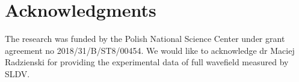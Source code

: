 \documentclass[preprint,9pt]{elsarticle}
\begin{document}
\clearpage	
\section*{Acknowledgments}
The research was funded by the Polish National Science Center under grant agreement no 2018/31/B/ST8/00454.
We would like to acknowledge dr Maciej Radzienski for providing the experimental data of full wavefield measured by SLDV.



\end{document}
